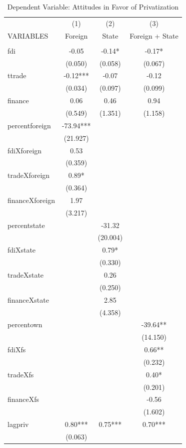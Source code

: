 \documentclass[12pt]{report}
\begin{document}
\begin{table}[htdp]
\caption{Dependent Variable: Attitudes in Favor of Privatization}
\vspace{2em}
\begin{center}
{\scriptsize
\begin{tabular}{lccc} \hline  & (1) & (2) & (3) \\ VARIABLES & Foreign & State & Foreign +
State \\ \hline  & &
 &  \\ fdi & -0.05 &
-0.14* & -0.17* \\  & (0.050) &
(0.058) & (0.067) \\
ttrade & -0.12*** & -0.07 & -0.12 \\  & (0.034) &
(0.097) & (0.099) \\
finance & 0.06 & 0.46 & 0.94 \\  & (0.549) &
(1.351) & (1.158) \\
percentforeign & -73.94*** &  &  \\  & (21.927) &
 &  \\ fdiXforeign &
0.53 &  &  \\  & (0.359) &
 &  \\ tradeXforeign &
0.89* &  &  \\  & (0.364) &
 &  \\ financeXforeign &
1.97 &  &  \\  & (3.217) &
 &  \\ percentstate &  &
-31.32 &  \\  &  &
(20.004) &  \\ fdiXstate
&  & 0.79* &  \\  &  &
(0.330) &  \\
tradeXstate &  & 0.26 &  \\  &  &
(0.250) &  \\
financeXstate &  & 2.85 &  \\  &  &
(4.358) &  \\ percentown
&  &  & -39.64** \\  &  &
 & (14.150) \\ fdiXfs &
&  & 0.66** \\  &  &
 & (0.232) \\ tradeXfs &
&  & 0.40* \\  &  &
 & (0.201) \\ financeXfs
&  &  & -0.56 \\  &  &
 & (1.602) \\ lagpriv &
0.80*** & 0.75*** & 0.70*** \\  & (0.063) &

\end{tabular}}
\end{center}
\end{table}
\end{document}
